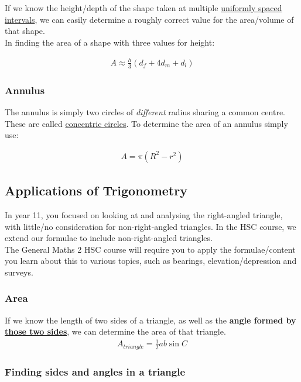 \documentclass{article}
\begin{document}
If we know the height/depth of the shape taken at multiple \underline{uniformly spaced intervals}, we can easily determine a roughly correct value for the area/volume of that shape. \\

In finding the area of a shape with three values for height:

\begin{align*}
A \approx \frac{h}{3}(d_f+4d_m+d_l) 
\end{align*}

\subsubsection{Annulus}

The annulus is simply two circles of \textit{different} radius sharing a common centre. These are called \underline{concentric circles}. To determine the area of an annulus simply use: 

\begin{align*}
A = \pi(R^2-r^2)
\end{align*}

\subsection{Applications of Trigonometry}

In year 11, you focused on looking at and analysing the right-angled triangle, with little/no consideration for non-right-angled triangles. In the HSC course, we extend our formulae to include non-right-angled triangles. \\

The General Maths 2 HSC course will require you to apply the formulae/content you learn about this to various topics, such as bearings, elevation/depression and surveys. 

\subsubsection{Area}

If we know the length of two sides of a triangle, as well as the \textbf{angle formed by \underline{those two sides}}, we can determine the area of that triangle. \\

\begin{align*}
A_{triangle} = \frac{1}{2}ab \sin C 
\end{align*}

\subsubsection{Finding sides and angles in a triangle}
\end{document}
